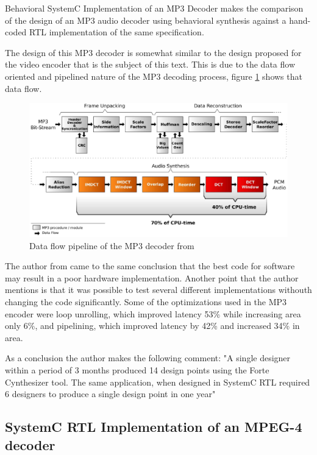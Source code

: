 \documentclass[a4paper, 12pt]{article}
\begin{document}
Behavioral SystemC Implementation of an MP3 Decoder\cite{mp3beh} makes the comparison of the design of an MP3 audio decoder using behavioral synthesis against a hand-coded RTL implementation of the same specification. 

The design of this MP3 decoder is somewhat similar to the design proposed for the video encoder that is the subject of this text. This is due to the data flow oriented and pipelined nature of the MP3 decoding process, figure \ref{fig:mp3} shows that data flow.

\begin{figure}[h]
\includegraphics[width=15cm]{figs/mp3.eps}
\caption{Data flow pipeline of the MP3 decoder from \cite{mp3beh}}
\label{fig:mp3}
\end{figure}

The author from \cite{mp3beh} came to the same conclusion that the best code for software may result in a poor hardware implementation. Another point that the author mentions is that it was possible to test several different implementations withouth changing the code significantly. Some of the optimizations used in the MP3 encoder were loop unrolling, which improved latency 53\% while increasing area only 6\%, and pipelining, which improved latency by 42\% and increased 34\% in area.

As a conclusion the author makes the following comment:
"A single designer within a period of
3 months produced 14 design points using
the Forte Cynthesizer tool.
The same application, when designed in
SystemC RTL required 6 designers to
produce a single design point in one year"

\subsection{SystemC RTL Implementation of an MPEG-4 decoder}
\end{document}

